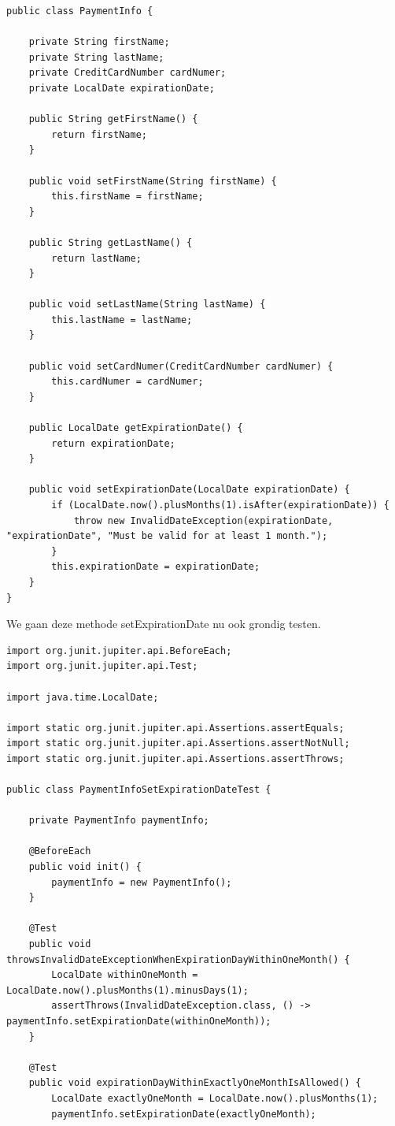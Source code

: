 \begin{itemize}
{\begin{lstlisting}
public class PaymentInfo {

	private String firstName;
	private String lastName;
	private CreditCardNumber cardNumer;
	private LocalDate expirationDate;

	public String getFirstName() {
		return firstName;
	}

	public void setFirstName(String firstName) {
		this.firstName = firstName;
	}

	public String getLastName() {
		return lastName;
	}

	public void setLastName(String lastName) {
		this.lastName = lastName;
	}

	public void setCardNumer(CreditCardNumber cardNumer) {
		this.cardNumer = cardNumer;
	}

	public LocalDate getExpirationDate() {
		return expirationDate;
	}

	public void setExpirationDate(LocalDate expirationDate) {
		if (LocalDate.now().plusMonths(1).isAfter(expirationDate)) {
			throw new InvalidDateException(expirationDate, "expirationDate", "Must be valid for at least 1 month.");
		}
		this.expirationDate = expirationDate;
	}
}
\end{lstlisting}

We gaan deze  methode setExpirationDate nu ook grondig testen.

\begin{lstlisting}
import org.junit.jupiter.api.BeforeEach;
import org.junit.jupiter.api.Test;

import java.time.LocalDate;

import static org.junit.jupiter.api.Assertions.assertEquals;
import static org.junit.jupiter.api.Assertions.assertNotNull;
import static org.junit.jupiter.api.Assertions.assertThrows;

public class PaymentInfoSetExpirationDateTest {

	private PaymentInfo paymentInfo;

	@BeforeEach
	public void init() {
		paymentInfo = new PaymentInfo();
	}

	@Test
	public void throwsInvalidDateExceptionWhenExpirationDayWithinOneMonth() {
		LocalDate withinOneMonth = LocalDate.now().plusMonths(1).minusDays(1);
		assertThrows(InvalidDateException.class, () -> paymentInfo.setExpirationDate(withinOneMonth));
	}

	@Test
	public void expirationDayWithinExactlyOneMonthIsAllowed() {
		LocalDate exactlyOneMonth = LocalDate.now().plusMonths(1);
		paymentInfo.setExpirationDate(exactlyOneMonth);


\end{lstlisting}}
\end{itemize}
